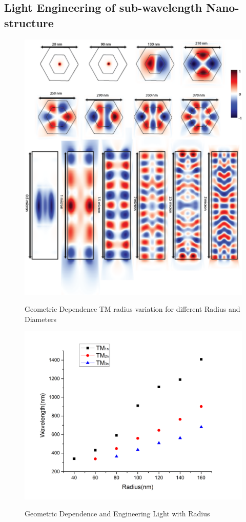 \subsection{Light Engineering of sub-wavelength Nano-structure}

\begin{figure}
  \caption{Geometric Dependence TM radius variation for different Radius and Diameters}
  \centering
  \includegraphics[width=\textwidth]{pictures/LM/TMradius}
  \label{TMradius}
\end{figure}

\begin{figure}
  \caption{Geometric Dependence and Engineering Light with Radius}
  \centering
  \includegraphics[width=\textwidth]{pictures/LM/TMRadiusScat}
  \label{TMRadiusScat}
\end{figure}

